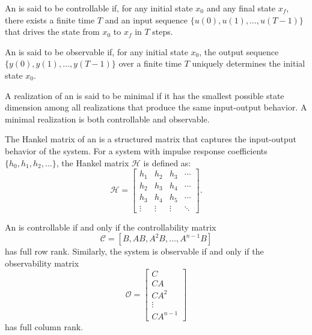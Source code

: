 \begin{definition}
[Controllability]
    An  is said to be controllable if, for any initial state $x_0$ and any final state $x_f$, there exists a finite time $T$ and an input sequence $\{u(0), u(1), \ldots, u(T-1)\}$ that drives the state from $x_0$ to $x_f$ in $T$ steps.
\end{definition}

\begin{definition}
[Observability]
    An  is said to be observable if, for any initial state $x_0$, the output sequence $\{y(0), y(1), \ldots, y(T-1)\}$ over a finite time $T$ uniquely determines the initial state $x_0$.
\end{definition}  

\begin{definition}
    A realization of an  is said to be minimal if it has the smallest possible state dimension among all realizations that produce the same input-output behavior. A minimal realization is both controllable and observable.
\end{definition}

\begin{definition}
    The Hankel matrix of an  is a structured matrix that captures the input-output behavior of the system. For a system with impulse response coefficients $\{h_0, h_1, h_2, \ldots\}$, the Hankel matrix $\mathcal{H}$ is defined as:
    \[
        \mathcal{H} = \begin{bmatrix}
        h_1 & h_2 & h_3 & \cdots \\
        h_2 & h_3 & h_4 & \cdots \\
        h_3 & h_4 & h_5 & \cdots \\
        \vdots & \vdots & \vdots & \ddots
        \end{bmatrix}.
    \]
\end{definition}

\begin{definition}
    An  is controllable if and only if the controllability matrix 
    \[
        \mathcal{C} = [B, AB, A^2B, \ldots, A^{n-1}B]
    \]
    has full row rank. Similarly, the system is observable if and only if the observability matrix
    \[
        \mathcal{O} = \begin{bmatrix}
        C \\
        CA \\
        CA^2 \\
        \vdots \\
        CA^{n-1}
        \end{bmatrix}
    \]
    has full column rank.
\end{definition}
